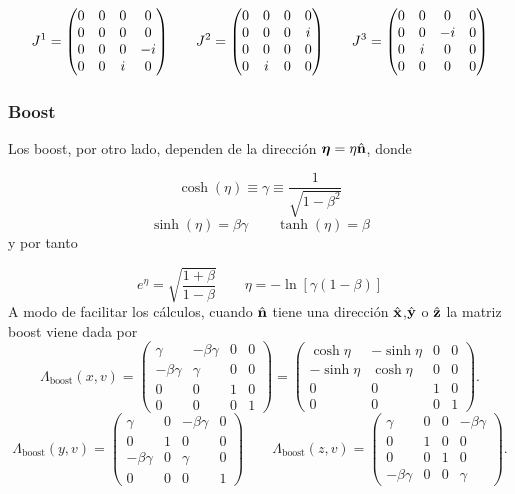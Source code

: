 \begin{equation}
	J^1=\mqty(0&0&0&0\\0&0&0&0\\0&0&0&-i\\0&0&i&0) \qquad J^2=\mqty(0&0&0&0\\0&0&0&i\\0&0&0&0\\0&i&0&0) \qquad J^3=\mqty(0&0&0&0\\0&0&-i&0\\0&i&0&0\\0&0&0&0)
\end{equation}


\subsubsection{Boost}
Los boost, por otro lado, dependen de la dirección $\boldsymbol{\eta}=\eta \hat{\mathbf{n}}$, donde

\begin{equation}
	\cosh(\eta)\equiv \gamma \equiv \frac{1}{\sqrt{1-\beta^2}}
\end{equation}
\begin{equation}
	\sinh(\eta) = \beta \gamma \qquad \tanh (\eta) = \beta
\end{equation}
y por tanto

\begin{equation}
	e^{\eta}= \sqrt{\frac{1+\beta}{1-\beta}} \qquad \eta=-\ln[\gamma(1-\beta)]
\end{equation}
A modo de facilitar los cálculos, cuando $\hat{\mathbf{n}}$ tiene una dirección $\hat{\mathbf{x}}$,$\hat{\mathbf{y}}$ o $\hat{\mathbf{z}}$ la matriz boost viene dada por
\begin{equation}
\Lambda_{ \text{boost}}(x,v) =
\begin{pmatrix}
	\gamma & -\beta\gamma & 0 & 0 \\
	-\beta\gamma & \gamma & 0 & 0 \\
	0 & 0 & 1 & 0 \\
	0 & 0 & 0 & 1
\end{pmatrix}
=
\begin{pmatrix}
	\cosh \eta & -\sinh \eta & 0 & 0 \\
	-\sinh \eta & \cosh \eta & 0 & 0 \\
	0 & 0 & 1 & 0 \\
	0 & 0 & 0 & 1
\end{pmatrix}.
\end{equation}
\begin{equation}
\Lambda_{ \text{boost}}(y,v) =
\begin{pmatrix}
	\gamma & 0 & -\beta\gamma & 0 \\
	0 & 1 & 0 & 0 \\
	-\beta\gamma & 0 & \gamma & 0 \\
	0 & 0 & 0 & 1
\end{pmatrix}
\qquad
\Lambda_{ \text{boost}}(z,v) =
\begin{pmatrix}
	\gamma & 0 & 0 & -\beta\gamma \\
	0 & 1 & 0 & 0 \\
	0 & 0 & 1 & 0 \\
	-\beta\gamma & 0 & 0 & \gamma
\end{pmatrix}.
\end{equation}


